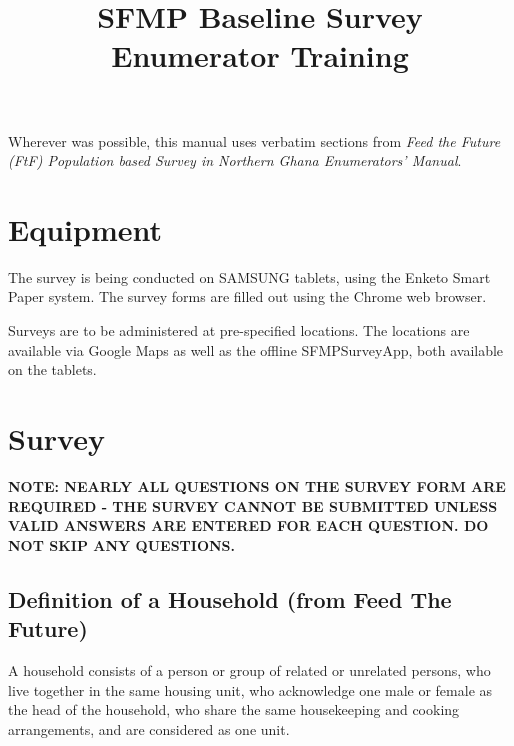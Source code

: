 \documentclass[a4paper]{refart}
\begin{document}
\title{SFMP Baseline Survey Enumerator Training}

\maketitle

Wherever was possible, this manual uses verbatim sections from \textit{Feed the Future (FtF) Population based Survey in Northern Ghana Enumerators' Manual}.

\section{Equipment}
The survey is being conducted on SAMSUNG tablets, using the Enketo Smart Paper system. The survey forms are filled out using the Chrome web browser.


Surveys are to be administered at pre-specified locations. The locations are available via Google Maps as well as the offline SFMPSurveyApp, both available on the tablets.

\section{Survey}

\textbf{NOTE: NEARLY ALL QUESTIONS ON THE SURVEY FORM ARE REQUIRED - THE SURVEY CANNOT BE SUBMITTED UNLESS VALID ANSWERS ARE ENTERED FOR EACH QUESTION. DO NOT SKIP ANY QUESTIONS.}


\subsection{Definition of a Household (from Feed The Future)} 

A household consists of a person or group of related or unrelated persons, who live together in the same housing unit, who acknowledge one male or female as the head of the household, who share the same housekeeping and cooking arrangements, and are considered as one unit. 
\end{document}
